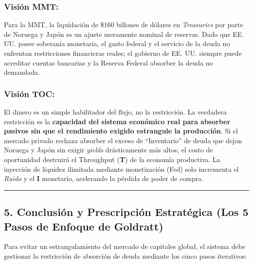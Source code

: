 \documentclass[12pt,letterpaper]{article}
\begin{document}
\hypertarget{visiuxf3n-mmt}{%
\subsubsection{\texorpdfstring{\textbf{Visión
MMT:}}{Visión MMT:}}\label{visiuxf3n-mmt}}

Para la MMT, la liquidación de \$160 billones de dólares en
\emph{Treasuries} por parte de Noruega y Japón es un ajuste meramente
nominal de reservas. Dado que EE. UU. posee soberanía monetaria, el
gasto federal y el servicio de la deuda no enfrentan restricciones
financieras reales; el gobierno de EE. UU. siempre puede acreditar
cuentas bancarias y la Reserva Federal absorber la deuda no demandada.

\hypertarget{visiuxf3n-toc}{%
\subsubsection{\texorpdfstring{\textbf{Visión
TOC:}}{Visión TOC:}}\label{visiuxf3n-toc}}

El dinero es un simple habilitador del flujo, no la restricción. La
verdadera restricción es la \textbf{capacidad del sistema económico real
para absorber pasivos sin que el rendimiento exigido estrangule la
producción}. Si el mercado privado rechaza absorber el exceso de
``Inventario'' de deuda que dejan Noruega y Japón sin exigir
\emph{yields} drásticamente más altos, el costo de oportunidad destruirá
el Throughput (\textbf{T}) de la economía productiva. La inyección de
liquidez ilimitada mediante monetización (Fed) solo incrementa el
\emph{Ruido} y el \textbf{I} monetario, acelerando la pérdida de poder
de compra.

\begin{center}\rule{0.5\linewidth}{0.5pt}\end{center}

\hypertarget{conclusiuxf3n-y-prescripciuxf3n-estratuxe9gica-los-5-pasos-de-enfoque-de-goldratt}{%
\subsection{5. Conclusión y Prescripción Estratégica (Los 5 Pasos de
Enfoque de
Goldratt)}\label{conclusiuxf3n-y-prescripciuxf3n-estratuxe9gica-los-5-pasos-de-enfoque-de-goldratt}}

Para evitar un estrangulamiento del mercado de capitales global, el
sistema debe gestionar la restricción de absorción de deuda mediante los
cinco pasos iterativos:
\end{document}
